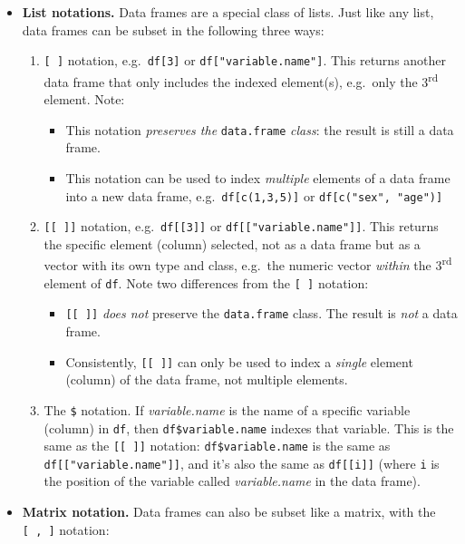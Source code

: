 \documentclass[
]{book}
\providecommand{\tightlist}{%
  \setlength{\itemsep}{0pt}\setlength{\parskip}{0pt}}
\begin{document}
\begin{itemize}
\tightlist
\item
  \textbf{List notations.} Data frames are a special class of lists. Just like any list, data frames can be subset in the following three ways:

  \begin{enumerate}
  \def\labelenumi{\arabic{enumi}.}
  \tightlist
  \item
    \texttt{{[}\ {]}} notation, e.g.~\texttt{df{[}3{]}} or \texttt{df{[}"variable.name"{]}}. This returns another data frame that only includes the indexed element(s), e.g.~only the 3\textsuperscript{rd} element. Note:

    \begin{itemize}
    \tightlist
    \item
      This notation \emph{preserves the} \texttt{data.frame} \emph{class}: the result is still a data frame.
    \item
      This notation can be used to index \emph{multiple} elements of a data frame into a new data frame, e.g.~\texttt{df{[}c(1,3,5){]}} or \texttt{df{[}c("sex",\ "age"){]}}
    \end{itemize}
  \item
    \texttt{{[}{[}\ {]}{]}} notation, e.g.~\texttt{df{[}{[}3{]}{]}} or \texttt{df{[}{[}"variable.name"{]}{]}}. This returns the specific element (column) selected, not as a data frame but as a vector with its own type and class, e.g.~the numeric vector \emph{within} the 3\textsuperscript{rd} element of \texttt{df}. Note two differences from the \texttt{{[}\ {]}} notation:

    \begin{itemize}
    \tightlist
    \item
      \texttt{{[}{[}\ {]}{]}} \emph{does not} preserve the \texttt{data.frame} class. The result is \emph{not} a data frame.
    \item
      Consistently, \texttt{{[}{[}\ {]}{]}} can only be used to index a \emph{single} element (column) of the data frame, not multiple elements.
    \end{itemize}
  \item
    The \texttt{\$} notation. If \emph{variable.name} is the name of a specific variable (column) in \texttt{df}, then \texttt{df\$variable.name} indexes that variable. This is the same as the \texttt{{[}{[}\ {]}{]}} notation: \texttt{df\$variable.name} is the same as \texttt{df{[}{[}"variable.name"{]}{]}}, and it's also the same as \texttt{df{[}{[}i{]}{]}} (where \texttt{i} is the position of the variable called \emph{variable.name} in the data frame).
  \end{enumerate}
\item
  \textbf{Matrix notation.} Data frames can also be subset like a matrix, with the \texttt{{[}\ ,\ {]}} notation:


\end{itemize}
\end{document}
